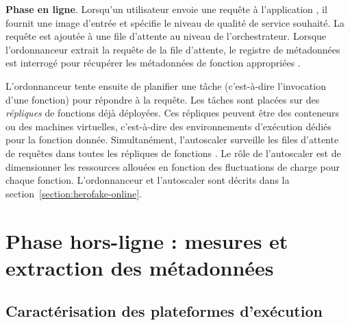 \textbf{Phase en ligne}. Lorsqu'un utilisateur envoie une requête à l'application , il fournit une image d'entrée et spécifie le niveau de qualité de service souhaité. La requête est ajoutée à une file d'attente  au niveau de l'orchestrateur. Lorsque l'ordonnanceur extrait la requête de la file d'attente, le registre de métadonnées est interrogé pour récupérer les métadonnées de fonction appropriées .

L'ordonnanceur tente ensuite de planifier une tâche (c'est-à-dire l'invocation d'une fonction) pour répondre à la requête. Les tâches sont placées sur des \textit{répliques} de fonctions  déjà déployées. Ces répliques peuvent être des conteneurs ou des machines virtuelles, c'est-à-dire des environnements d'exécution dédiés pour la fonction donnée. Simultanément, l'autoscaler surveille les files d'attente de requêtes dans toutes les répliques de fonctions . Le rôle de l'autoscaler est de dimensionner les ressources allouées en fonction des fluctuations de charge pour chaque fonction. L'ordonnanceur et l'autoscaler sont décrits dans la section~\ref{section:herofake-online}.

\section{Phase hors-ligne : mesures et extraction des métadonnées}
\label{section:herofake-offline}

\subsection{Caractérisation des plateformes d'exécution}

\begin{table}[t]
\caption{Execution platform characterization}
\begin{center}
\end{center}
\label{table:herofake-platforms}
\end{table}

